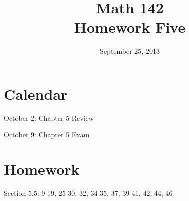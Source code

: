 \documentclass{exam}
\author{}
\date{September 25, 2013}
\title{Math 142 \\ Homework Five}
\begin{document}
  \maketitle

  \ifprintanswers
  \else
    \section{Calendar}
    \begin{itemize*}
      \item October 2: Chapter 5 Review
      \item October 9: Chapter 5 Exam
    \end{itemize*}
  \fi

  \section{Homework}
  Section 5.5: 9-19, 25-30, 32, 34-35, 37, 39-41, 42, 44, 46


  \ifprintanswers
\end{document}
